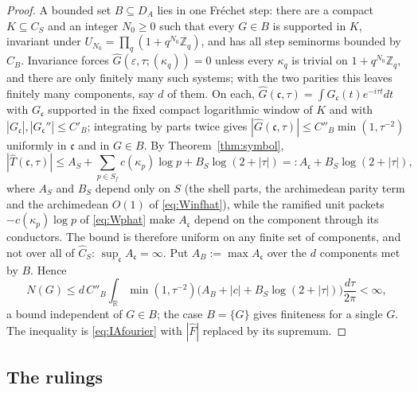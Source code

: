 \documentclass[11pt]{amsart}
\theoremstyle{definition}
\theoremstyle{remark}
\newcommand{\R}{\mathbb R}
\newcommand{\Z}{\mathbb Z}
\newcommand{\Th}{\widehat{T}}
\newcommand{\Ch}{\widehat{C}_S}
\newcommand{\DA}{D_A}
\begin{document}
\begin{proof}
A bounded set $B\subseteq\DA$ lies in one Fr\'echet step: there are a compact
$K\subseteq C_S$ and an integer $N_0\ge0$ such that every $G\in B$ is supported
in $K$, invariant under $U_{N_0}=\prod_q(1+q^{N_0}\Z_q)$, and has all step
seminorms bounded by $C_B$.  Invariance forces $\widehat G(\varepsilon,\tau;
(\kappa_q))=0$ unless every $\kappa_q$ is trivial on $1+q^{N_0}\Z_q$, and
there are only finitely many such systems; with the two parities this leaves
finitely many components, say $d$ of them.  On each,
$\widehat G(\mathfrak c,\tau)=\int G_{\mathfrak c}(t)e^{-i\tau t}dt$ with
$G_{\mathfrak c}$ supported in the fixed compact logarithmic window of $K$ and
with $|G_{\mathfrak c}|,|G_{\mathfrak c}''|\le C'_B$; integrating by parts twice
gives $|\widehat G(\mathfrak c,\tau)|\le C''_B\min(1,\tau^{-2})$ uniformly in
$\mathfrak c$ and in $G\in B$.  By Theorem~\ref{thm:symbol},
\begin{equation}\label{eq:logbound}
|\Th(\mathfrak c,\tau)|\le A_S+\sum_{p\in S_f}c(\kappa_p)\log p
+B_S\log(2+|\tau|)=:A_{\mathfrak c}+B_S\log(2+|\tau|),
\end{equation}
where $A_S$ and $B_S$ depend only on $S$ (the shell parts, the archimedean
parity term and the archimedean $O(1)$ of \eqref{eq:Winfhat}), while the
ramified unit packets $-c(\kappa_p)\log p$ of \eqref{eq:Wphat} make
$A_{\mathfrak c}$ depend on the component through its conductors.  The bound is
therefore uniform on any finite set of components, and not over all of $\Ch$:
$\sup_{\mathfrak c}A_{\mathfrak c}=\infty$.  Put
$A_B:=\max A_{\mathfrak c}$ over the $d$ components met by $B$.  Hence
\[
N(G)\le d\,C''_B\int_{\R}\min(1,\tau^{-2})
\bigl(A_B+|c|+B_S\log(2+|\tau|)\bigr)\frac{d\tau}{2\pi}<\infty ,
\]
a bound independent of $G\in B$; the case $B=\{G\}$ gives finiteness for a
single $G$.  The inequality is \eqref{eq:IAfourier} with $|\widehat F|$ replaced
by its supremum.
\end{proof}

\subsection{The rulings}
\end{document}
